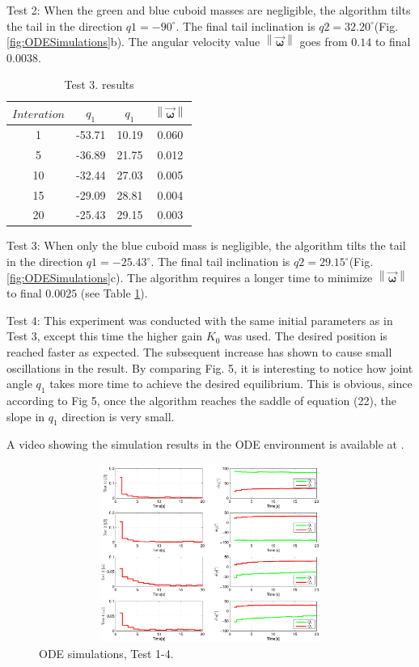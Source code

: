 Test 2: When the green and blue cuboid masses are negligible, the algorithm tilts the tail in the direction $q1=-90^{\circ}$. The final tail inclination is $q2=32.20^{\circ}$(Fig. \ref{fig:ODESimulations}b). The angular velocity value $\left \| \vec{\boldsymbol{\omega}} \right \|$ goes from $0.14$ to final $0.0038$. 

\begin{table}[!t]
	\centering
\begin{tabular}{|c|c|c|c|}
	\hline
$Interation$ & $q_1$ & $q_1$  & $\left \| \vec{\boldsymbol{\omega}} \right \|$\\
	\hline
1 & -53.71 & 10.19 & 0.060\\
5 & -36.89 & 21.75 & 0.012\\
10 & -32.44 & 27.03 &  0.005\\
15 & -29.09 & 28.81 & 0.004\\
20 & -25.43 & 29.15 &  0.003\\
\hline
\end{tabular}
\caption{Test 3. results}\label{tab:Simulations2}
\end{table}

Test 3: When only the blue cuboid mass is negligible, the algorithm tilts the tail in the direction $q1=-25.43^{\circ}$. The final tail inclination is $q2=29.15^{\circ}$(Fig. \ref{fig:ODESimulations}c). The algorithm requires a longer time to minimize $\left \| \vec{\boldsymbol{\omega}} \right \|$ to final $0.0025$ (see Table \ref{tab:Simulations2}).



Test 4: This experiment was conducted with the same initial parameters as in Test 3, except this time the higher gain $K_0$ was used. The desired position is reached faster as expected. The subsequent increase has shown to cause small oscillations in the result. By comparing Fig. 5, it is interesting to notice how joint angle $q_1$ takes more time to achieve the desired equilibrium. This is obvious, since according to Fig 5, once the algorithm reaches the saddle of equation (22), the slope in $q_1$ direction is very small.

A video showing the simulation results in the ODE environment is available at \cite{IROS2013Movie}.


\begin{figure}[!t]
	\centering
	\includegraphics[width=120mm,height=220]{./pictures/ODE_graph.pdf}
	\caption{ODE simulations, Test 1-4.}
	\label{fig:ODE graph}
\end{figure}


